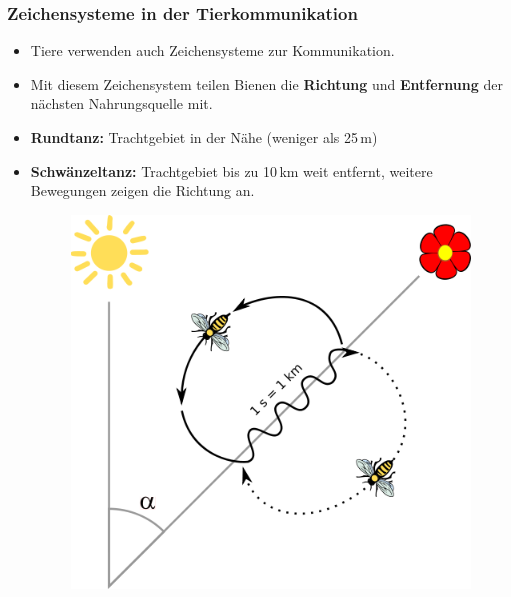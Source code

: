 \begin{frame}
\frametitle{Zeichensysteme in der Tierkommunikation}

\begin{itemize}
	\item<1-> Tiere verwenden auch Zeichensysteme zur Kommunikation.
\end{itemize}			
			




\begin{itemize}
	\item<2-> Mit diesem Zeichensystem teilen Bienen die \textbf{Richtung} und \textbf{Entfernung} der nächsten Nahrungsquelle mit. 
	\item<2-> \textbf{Rundtanz:} Trachtgebiet in der Nähe (weniger als 25\,m)
	\item<2-> \textbf{Schwänzeltanz:} Trachtgebiet bis zu 10\,km weit entfernt, weitere Bewegungen zeigen die Richtung an.

\begin{figure}[H]
\centering
\includegraphics[scale=0.14]{material/Bee-dance}
\label{Zeichen2}
\end{figure}

\end{itemize}		
		
\end{frame}			


